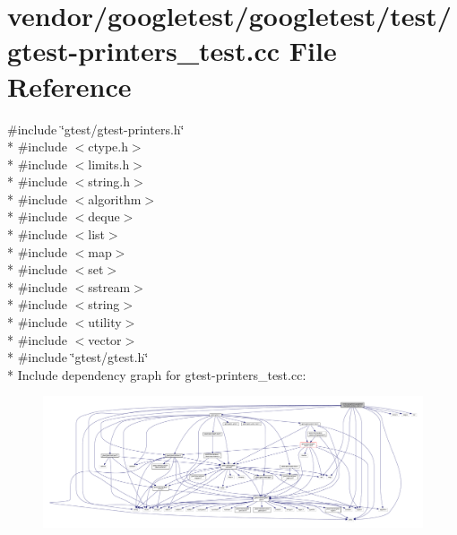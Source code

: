 \hypertarget{gtest-printers__test_8cc}{}\section{vendor/googletest/googletest/test/gtest-\/printers\+\_\+test.cc File Reference}
\label{gtest-printers__test_8cc}
{\ttfamily \#include \char`\"{}gtest/gtest-\/printers.\+h\char`\"{}}\\*
{\ttfamily \#include $<$ctype.\+h$>$}\\*
{\ttfamily \#include $<$limits.\+h$>$}\\*
{\ttfamily \#include $<$string.\+h$>$}\\*
{\ttfamily \#include $<$algorithm$>$}\\*
{\ttfamily \#include $<$deque$>$}\\*
{\ttfamily \#include $<$list$>$}\\*
{\ttfamily \#include $<$map$>$}\\*
{\ttfamily \#include $<$set$>$}\\*
{\ttfamily \#include $<$sstream$>$}\\*
{\ttfamily \#include $<$string$>$}\\*
{\ttfamily \#include $<$utility$>$}\\*
{\ttfamily \#include $<$vector$>$}\\*
{\ttfamily \#include \char`\"{}gtest/gtest.\+h\char`\"{}}\\*
Include dependency graph for gtest-\/printers\+\_\+test.cc\+:\nopagebreak
\begin{figure}[H]
\begin{center}
\leavevmode
\includegraphics[width=350pt]{gtest-printers__test_8cc__incl}
\end{center}
\end{figure}

